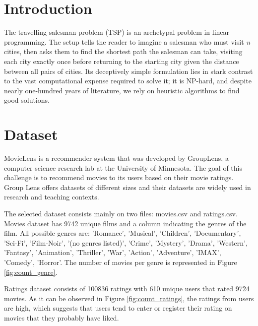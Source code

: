 \documentclass[12pt]{article}
\numberwithin{equation}{section}
\begin{document}
\newpage

\section{Introduction}

The travelling salesman problem (TSP) is an archetypal problem in linear programming. The setup tells the reader to imagine a salesman who must visit \textit{n} cities, then asks them to find the shortest path the salesman can take, visiting each city exactly once before returning to the starting city given the distance between all pairs of cities. Its deceptively simple formulation lies in stark contrast to the vast computational expense required to solve it; it is NP-hard, and despite nearly one-hundred years of literature, we rely on heuristic algorithms to find good solutions. 

\section{Dataset}

MovieLens is a recommender system that was developed by GroupLens, a computer science research lab at the University of Minnesota. The goal of this challenge is to recommend movies to its users based on their movie ratings. Group Lens offers datasets of different sizes and their datasets are widely used in research and teaching contexts.

The selected dataset consists mainly on two files: movies.csv and ratings.csv. Movies dataset has 9742 unique films and a column indicating the genres of the film. All possible genres are: 'Romance', 'Musical', 'Children', 'Documentary', 'Sci-Fi', 'Film-Noir', '(no genres listed)', 'Crime', 'Mystery', 'Drama', 'Western', 'Fantasy', 'Animation', 'Thriller', 'War', 'Action', 'Adventure', 'IMAX', 'Comedy', 'Horror'. The number of movies per genre is represented in Figure \ref{fig:count_genre}.

Ratings dataset consists of 100836 ratings with 610 unique users that rated 9724 movies. As it can be observed in Figure \ref{fig:count_ratings}, the ratings from users are high, which suggests that users tend to enter or register their rating on movies that they probably have liked. 

\begin{figure}[h!]
 \end{figure}
\end{document}
